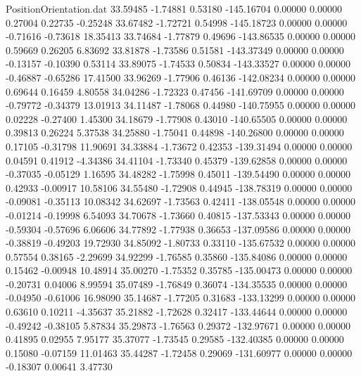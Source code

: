 \begin{filecontents}{PositionOrientation.dat}
  33.59485   -1.74881    0.53180  -145.16704    0.00000    0.00000    0.27004    0.22735   -0.25248
  33.67482   -1.72721    0.54998  -145.18723    0.00000    0.00000   -0.71616   -0.73618   18.35413
  33.74684   -1.77879    0.49696  -143.86535    0.00000    0.00000    0.59669    0.26205    6.83692
  33.81878   -1.73586    0.51581  -143.37349    0.00000    0.00000   -0.13157   -0.10390    0.53114
  33.89075   -1.74533    0.50834  -143.33527    0.00000    0.00000   -0.46887   -0.65286   17.41500
  33.96269   -1.77906    0.46136  -142.08234    0.00000    0.00000    0.69644    0.16459    4.80558
  34.04286   -1.72323    0.47456  -141.69709    0.00000    0.00000   -0.79772   -0.34379   13.01913
  34.11487   -1.78068    0.44980  -140.75955    0.00000    0.00000    0.02228   -0.27400    1.45300
  34.18679   -1.77908    0.43010  -140.65505    0.00000    0.00000    0.39813    0.26224    5.37538
  34.25880   -1.75041    0.44898  -140.26800    0.00000    0.00000    0.17105   -0.31798   11.90691
  34.33884   -1.73672    0.42353  -139.31494    0.00000    0.00000    0.04591    0.41912   -4.34386
  34.41104   -1.73340    0.45379  -139.62858    0.00000    0.00000   -0.37035   -0.05129    1.16595
  34.48282   -1.75998    0.45011  -139.54490    0.00000    0.00000    0.42933   -0.00917   10.58106
  34.55480   -1.72908    0.44945  -138.78319    0.00000    0.00000   -0.09081   -0.35113   10.08342
  34.62697   -1.73563    0.42411  -138.05548    0.00000    0.00000   -0.01214   -0.19998    6.54093
  34.70678   -1.73660    0.40815  -137.53343    0.00000    0.00000   -0.59304   -0.57696    6.06606
  34.77892   -1.77938    0.36653  -137.09586    0.00000    0.00000   -0.38819   -0.49203   19.72930
  34.85092   -1.80733    0.33110  -135.67532    0.00000    0.00000    0.57554    0.38165   -2.29699
  34.92299   -1.76585    0.35860  -135.84086    0.00000    0.00000    0.15462   -0.00948   10.48914
  35.00270   -1.75352    0.35785  -135.00473    0.00000    0.00000   -0.20731    0.04006    8.99594
  35.07489   -1.76849    0.36074  -134.35535    0.00000    0.00000   -0.04950   -0.61006   16.98090
  35.14687   -1.77205    0.31683  -133.13299    0.00000    0.00000    0.63610    0.10211   -4.35637
  35.21882   -1.72628    0.32417  -133.44644    0.00000    0.00000   -0.49242   -0.38105    5.87834
  35.29873   -1.76563    0.29372  -132.97671    0.00000    0.00000    0.41895    0.02955    7.95177
  35.37077   -1.73545    0.29585  -132.40385    0.00000    0.00000    0.15080   -0.07159   11.01463
  35.44287   -1.72458    0.29069  -131.60977    0.00000    0.00000   -0.18307    0.00641    3.47730

\end{filecontents}
